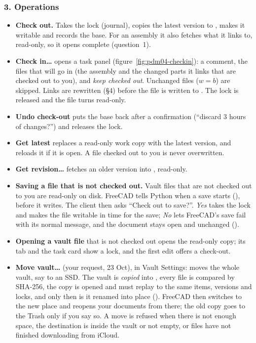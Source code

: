 \subsubsection*{3. Operations}

\begin{itemize}[nosep]
  \item \textbf{Check out.} Takes the lock (journal), copies the latest version to ,
        makes it writable and records the base. For an assembly it also fetches what it links to, read-only, so
        it opens complete (question~1).
  \item \textbf{Check in\ldots} opens a task panel (figure~\ref{fig:pdm04-checkin}): a comment, the files that
        will go in (the assembly and the changed parts it links that are checked out to you), and \emph{keep
        checked out}. Unchanged files ($w = b$) are skipped. Links are rewritten (\S4) before the file is
        written to . The lock is released and the file turns read-only.
  \item \textbf{Undo check-out} puts the base back after a confirmation (``discard 3 hours of changes?'') and
        releases the lock.
  \item \textbf{Get latest} replaces a read-only work copy with the latest version, and reloads it if it is open.
        A file checked out to you is never overwritten.
  \item \textbf{Get revision\ldots} fetches an older version into , read-only.
  \item \textbf{Saving a file that is not checked out.} Vault files that are not checked out to you are
        read-only on disk. FreeCAD tells Python when a save starts (), before it
        writes. The client then asks ``Check out  to save?''. \emph{Yes} takes the lock and
        makes the file writable in time for the save; \emph{No} lets FreeCAD's save fail with its normal message,
        and the document stays open and unchanged (\verify).
  \item \textbf{Opening a vault file} that is not checked out opens the read-only copy; its tab and the task card
        show a lock, and the first edit offers a check-out.
  \item \textbf{Move vault\ldots} (your request, 23 Oct), in Vault Settings: moves the whole vault, say to an SSD.
        The vault is \emph{copied} into , every file is compared by SHA-256, the copy is opened and
        must replay to the same items, versions and locks, and only then is it renamed into place
        (). FreeCAD then switches to the new place and reopens your documents from
        there; the old copy goes to the Trash only if you say so. A move is refused when there is not enough space,
        the destination is inside the vault or not empty, or files have not finished downloading from iCloud.
\end{itemize}

